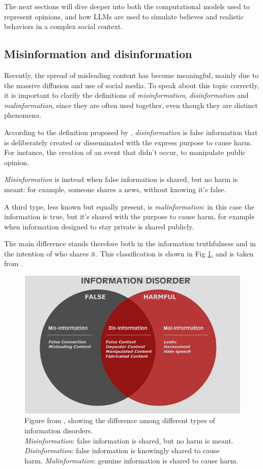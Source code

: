 \medskip
The next sections will dive deeper into both the computational models used to represent opinions, and how LLMs are used to simulate believes and realistic behaviors in a complex social context.





\subsection{Misinformation and disinformation} %
Recently, the spread of misleading content has become meaningful, mainly due to the massive diffusion and use of social media.
To speak about this topic correctly, it is important to clarify the definitions of \textit{misinformation}, \textit{disinformation} and \textit{malinformation}, since they are often used together, even though they are distinct phenomena.


According to the definition proposed by \citet{wardle2017information, wardle2017information}, \textit{disinformation} is false information that is deliberately created or disseminated with the express purpose to cause harm.
For instance, the creation of an event that didn't occur, to manipulate public opinion.

\textit{Misinformation} is instead when false information is shared, but no harm is meant: for example, someone shares a news, without knowing it's false.

A third type, less known but equally present, is \textit{malinformation}: in this case the information is true, but it's shared with the purpose to cause harm, for example when information designed to stay private is shared publicly.

The main difference stands therefore both in the information truthfulness and in the intention of who shares it. This classification is shown in Fig \ref{fig:info_disorder}, and is taken from \cite{wardle2017information}.

\begin{figure}[h]
    \centering
    \includegraphics[width=0.5\linewidth]{Images/information_disorder_Wardle.png}
    \caption{Figure from \cite{wardle2017information}, showing the difference among different types of information disorders.\\
    \textit{Misinformation}: false information is shared, but no harm is meant. \textit{Disinformation}: false information is knowingly shared to cause harm. \textit{Malinformation}: genuine information is shared to cause harm.}
    \label{fig:info_disorder}
\end{figure}


